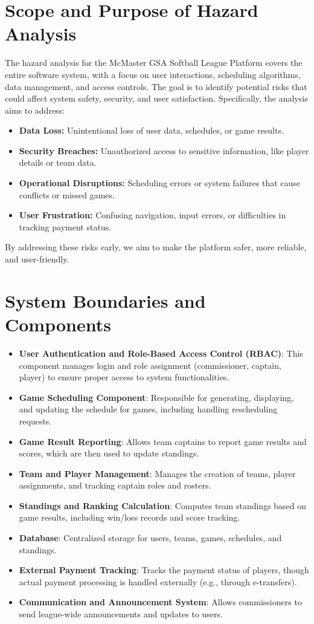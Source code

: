 \documentclass{article}
\begin{document}
\section{Scope and Purpose of Hazard Analysis}
The hazard analysis for the McMaster GSA Softball League Platform covers the entire software system, with a focus on user interactions, scheduling algorithms, data management, and access controls. The goal is to identify potential risks that could affect system safety, security, and user satisfaction. Specifically, the analysis aims to address:\begin{itemize}
    \item \textbf{Data Loss:} Unintentional loss of user data, schedules, or game results.
    \item \textbf{Security Breaches:} Unauthorized access to sensitive information, like player details or team data.
    \item \textbf{Operational Disruptions:} Scheduling errors or system failures that cause conflicts or missed games.
    \item \textbf{User Frustration:} Confusing navigation, input errors, or difficulties in tracking payment status.
\end{itemize}
By addressing these risks early, we aim to make the platform safer, more reliable, and user-friendly.

\section{System Boundaries and Components}

\begin{itemize}
    \item \textbf{User Authentication and Role-Based Access Control (RBAC)}: This component manages login and role assignment (commissioner, captain, player) to ensure proper access to system functionalities.
    \item \textbf{Game Scheduling Component}: Responsible for generating, displaying, and updating the schedule for games, including handling rescheduling requests.
    \item \textbf{Game Result Reporting}: Allows team captains to report game results and scores, which are then used to update standings.
    \item \textbf{Team and Player Management}: Manages the creation of teams, player assignments, and tracking captain roles and rosters.
    \item \textbf{Standings and Ranking Calculation}: Computes team standings based on game results, including win/loss records and score tracking.
    \item \textbf{Database}: Centralized storage for users, teams, games, schedules, and standings.
    \item \textbf{External Payment Tracking}: Tracks the payment status of players, though actual payment processing is handled externally (e.g., through e-transfers).
    \item \textbf{Communication and Announcement System}: Allows commissioners to send league-wide announcements and updates to users.
\end{itemize}
\end{document}
